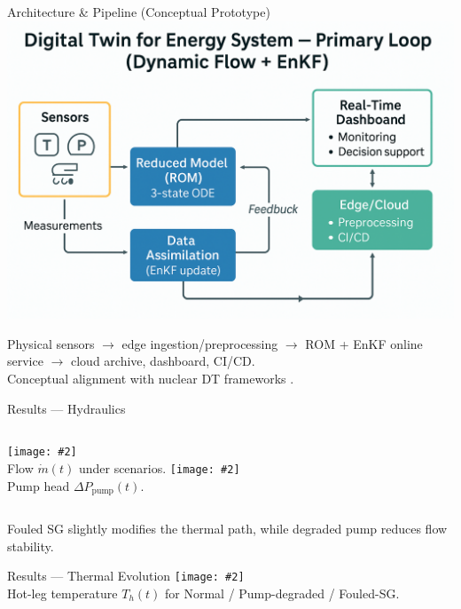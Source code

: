 \documentclass[aspectratio=169]{beamer}
\newcommand{\img}[2][]{\texttt{[image: \#2]}}
\begin{document}
\begin{frame}{Architecture \& Pipeline (Conceptual Prototype)}
\centering
\includegraphics[width=0.8\linewidth]{assets/arch_twin_energy.png}

\vspace{0.6em}
\footnotesize
Physical sensors $\rightarrow$ edge ingestion/preprocessing $\rightarrow$ ROM + EnKF online service $\rightarrow$ cloud archive, dashboard, CI/CD.\\
Conceptual alignment with nuclear DT frameworks \cite{Liu2024_DigitalTwinNuclear,Xiong2025_DeepONetTwin,NRC2021_DigitalTwinChallenges}.
\end{frame}

\begin{frame}{Results — Hydraulics}
\begin{columns}[T,onlytextwidth]
\img[0.98]{assets/fig_flow_cases_dynamic.png}\\[-0.2em]
\footnotesize Flow $\dot m(t)$ under scenarios.
\img[0.98]{assets/fig_dpump_cases_dynamic.png}\\[-0.2em]
\footnotesize Pump head $\Delta P_{\text{pump}}(t)$.
\end{columns}
\medskip
\footnotesize
Fouled SG slightly modifies the thermal path, while degraded pump reduces flow stability.
\end{frame}

\begin{frame}{Results — Thermal Evolution}
\centering
\img[0.9]{assets/fig_temperature_dynamic.png}\\[-0.2em]
\footnotesize Hot-leg temperature $T_h(t)$ for Normal / Pump-degraded / Fouled-SG.
\end{frame}
\end{document}

